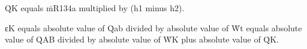 Q̇K equals ṁR134a multiplied by (h1 minus h2).  

εK equals absolute value of Q̇ab divided by absolute value of Ẇt equals absolute value of Q̇AB divided by absolute value of ẆK plus absolute value of Q̇K.